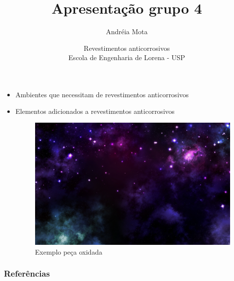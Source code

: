 \documentclass{beamer}
\title[Grupo 4]{\Huge{Apresentação grupo 4}}
\author[Autores]{Andréia Mota \\
    \text{\scriptsize{amota@usp.br}}}
\date[Data]{\scriptsize{Revestimentos anticorrosivos} \\ Escola de Engenharia de Lorena - USP}
\begin{document}
\begin{frame}
  \titlepage
\end{frame}

{
\begin{frame}
\begin{tcolorbox}[colback=blue!5!white,colframe=blue!70!white,title=Introdução]
\begin{itemize}

  	  \item{Ambientes que necessitam de revestimentos anticorrosivos}
 	   \item{Elementos adicionados a revestimentos anticorrosivos}

            \begin{figure}[!htb]
              \begin{center}

                \caption{Exemplo peça oxidada}
                \includegraphics[width=0.7\linewidth]{../Imagens/Fundo1.jpg}
              \end{center}
            \end{figure}



\end{itemize}
\end{tcolorbox}
\end{frame}

\begin{frame}
  \frametitle{Referências}

  

  \end{frame}
}
\end{document}
